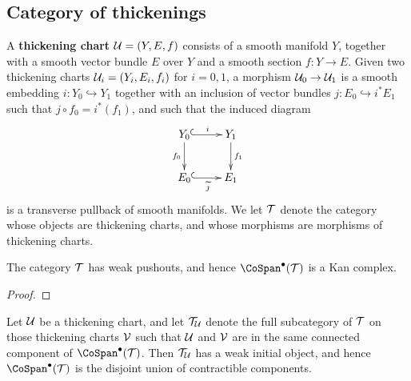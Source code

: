\subsection{Category of thickenings}

\begin{definition}
A {\bf thickening chart}  $\mathcal U = (Y, E, f)$ consists of a smooth manifold $Y$, together with a smooth vector bundle $E$ over $Y$ and a smooth section $f: Y \to E$. Given two thickening charts $\mathcal U_i = (Y_i, E_i, f_i)$ for $i = 0, 1$, a morphism $\mathcal U_0 \to \mathcal U_1$ is a smooth embedding $i: Y_0 \hookrightarrow Y_1$ together with an inclusion of vector bundles $j: E_0 \hookrightarrow i^* E_1$ such that $j \circ f_0 = i^*(f_1)$, and such that the induced diagram
\[\xymatrix{
		Y_0 \ar[d]_-{f_0} \ar@{^{(}->}[r]^-{i} & Y_1 \ar[d]^-{f_1} \\
		E_0 \ar@{^{(}->}[r]_-{\widetilde{\jmath}} & E_1}\]
is a transverse pullback of smooth manifolds. We let $\mathcal T$ denote the category whose objects are thickening charts, and whose morphisms are morphisms of thickening charts.
\end{definition}

\begin{remark}
\end{remark}

\begin{prop}\label{weak-pullback-charts}
The category $\mathcal T$ has weak pushouts, and hence $\CoSpan^\bullet(\cT)$ is a Kan complex. 
\end{prop}

\begin{proof}
\jake{[To be done.]}
\end{proof}

\begin{prop}\label{weak-initial-charts}
Let $\mathcal U$ be a thickening chart, and let $\mathcal T_\mathcal U$ denote the full subcategory of $\mathcal T$ on those thickening charts $\mathcal V$ such that $\mathcal U$ and $\mathcal V$ are in the same connected component of $\CoSpan^\bullet(\cT)$. Then $\mathcal T_\mathcal U$ has a weak initial object, and hence $\CoSpan^\bullet(\cT)$ is the disjoint union of contractible components. 
\end{prop}

